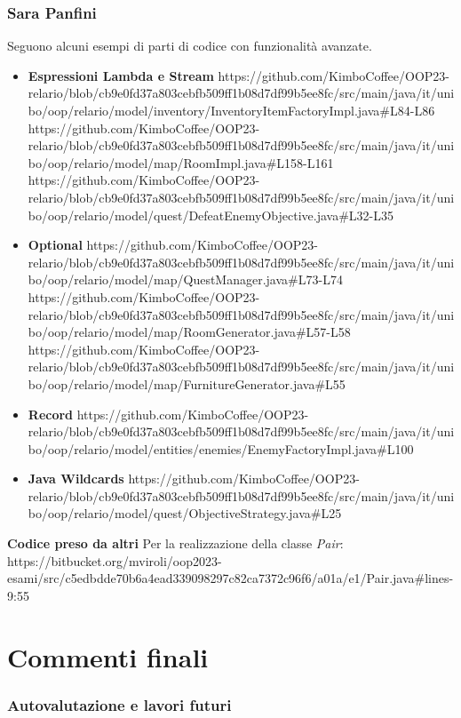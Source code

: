 \documentclass[a4paper,12pt]{report}
\begin{document}
\subsection{\textbf{Sara Panfini}}
Seguono alcuni esempi di parti di codice con funzionalità avanzate.
\begin{itemize}
	\item \textbf{Espressioni Lambda e Stream}
	https://github.com/KimboCoffee/OOP23-relario/blob/cb9e0fd37a803cebfb509ff1b08d7df99b5ee8fc/src/main/java/it/unibo/oop/relario/model/inventory/InventoryItemFactoryImpl.java#L84-L86
	https://github.com/KimboCoffee/OOP23-relario/blob/cb9e0fd37a803cebfb509ff1b08d7df99b5ee8fc/src/main/java/it/unibo/oop/relario/model/map/RoomImpl.java#L158-L161
	https://github.com/KimboCoffee/OOP23-relario/blob/cb9e0fd37a803cebfb509ff1b08d7df99b5ee8fc/src/main/java/it/unibo/oop/relario/model/quest/DefeatEnemyObjective.java#L32-L35
	\item \textbf{Optional}
	https://github.com/KimboCoffee/OOP23-relario/blob/cb9e0fd37a803cebfb509ff1b08d7df99b5ee8fc/src/main/java/it/unibo/oop/relario/model/map/QuestManager.java#L73-L74
	https://github.com/KimboCoffee/OOP23-relario/blob/cb9e0fd37a803cebfb509ff1b08d7df99b5ee8fc/src/main/java/it/unibo/oop/relario/model/map/RoomGenerator.java#L57-L58
	https://github.com/KimboCoffee/OOP23-relario/blob/cb9e0fd37a803cebfb509ff1b08d7df99b5ee8fc/src/main/java/it/unibo/oop/relario/model/map/FurnitureGenerator.java#L55
	\item \textbf{Record}
	https://github.com/KimboCoffee/OOP23-relario/blob/cb9e0fd37a803cebfb509ff1b08d7df99b5ee8fc/src/main/java/it/unibo/oop/relario/model/entities/enemies/EnemyFactoryImpl.java#L100
	\item \textbf{Java Wildcards}
	https://github.com/KimboCoffee/OOP23-relario/blob/cb9e0fd37a803cebfb509ff1b08d7df99b5ee8fc/src/main/java/it/unibo/oop/relario/model/quest/ObjectiveStrategy.java#L25
\end{itemize}
\newline
\textbf{Codice preso da altri}
Per la realizzazione della classe \textit{Pair}: https://bitbucket.org/mviroli/oop2023-esami/src/c5edbdde70b6a4ead339098297c82ca7372c96f6/a01a/e1/Pair.java#lines-9:55


\chapter{Commenti finali}
\subsection{Autovalutazione e lavori futuri}
\end{document}
